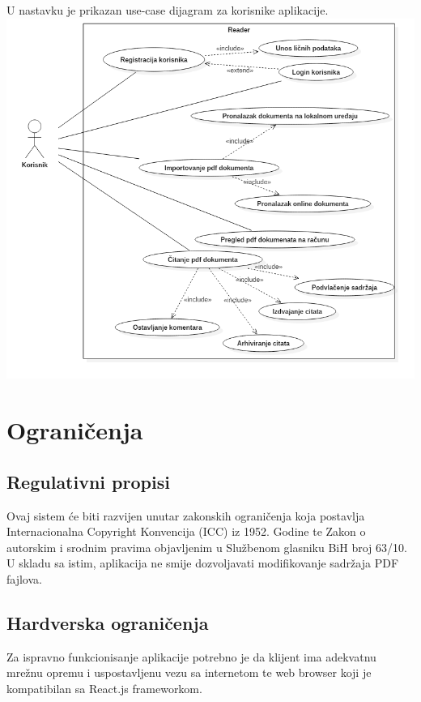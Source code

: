 U nastavku je prikazan use-case dijagram za korisnike aplikacije. \\

\includegraphics[scale=0.45]{images/UseCaseKorisnik.png}

\section{Ograničenja}

\subsection{Regulativni propisi}
Ovaj sistem će biti razvijen unutar zakonskih ograničenja koja postavlja Internacionalna Copyright Konvencija (ICC) iz 1952. Godine te Zakon o autorskim i srodnim pravima objavljenim u Službenom glasniku BiH broj 63/10. U skladu sa istim, aplikacija ne smije dozvoljavati modifikovanje sadržaja PDF fajlova.

\subsection{Hardverska ograničenja}
Za ispravno funkcionisanje aplikacije potrebno je da klijent ima adekvatnu mrežnu opremu i uspostavljenu vezu sa internetom te web browser koji je kompatibilan sa React.js frameworkom.

